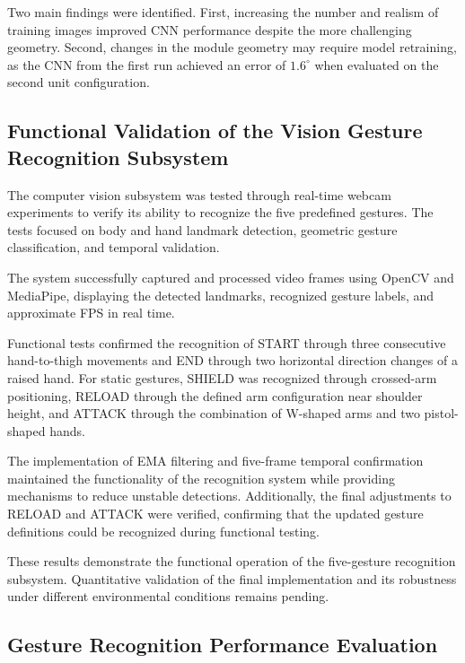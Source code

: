 \documentclass[lettersize,journal]{IEEEtran}
\begin{document}
	Two main findings were identified. First, increasing the number and realism of training images improved CNN performance despite the more challenging geometry. Second, changes in the module geometry may require model retraining, as the CNN from the first run achieved an error of $1.6^\circ$ when evaluated on the second unit configuration.

	\subsection{Functional Validation of the Vision Gesture Recognition Subsystem}
	
	The computer vision subsystem was tested through real-time webcam experiments to verify its ability to recognize the five predefined gestures. The tests focused on body and hand landmark detection, geometric gesture classification, and temporal validation.
	
	The system successfully captured and processed video frames using OpenCV and MediaPipe, displaying the detected landmarks, recognized gesture labels, and approximate FPS in real time.
	
	Functional tests confirmed the recognition of START through three consecutive hand-to-thigh movements and END through two horizontal direction changes of a raised hand. For static gestures, SHIELD was recognized through crossed-arm positioning, RELOAD through the defined arm configuration near shoulder height, and ATTACK through the combination of W-shaped arms and two pistol-shaped hands.
	
	The implementation of EMA filtering and five-frame temporal confirmation maintained the functionality of the recognition system while providing mechanisms to reduce unstable detections. Additionally, the final adjustments to RELOAD and ATTACK were verified, confirming that the updated gesture definitions could be recognized during functional testing.
	
	These results demonstrate the functional operation of the five-gesture recognition subsystem. Quantitative validation of the final implementation and its robustness under different environmental conditions remains pending.

	\subsection{Gesture Recognition Performance Evaluation}
\end{document}
